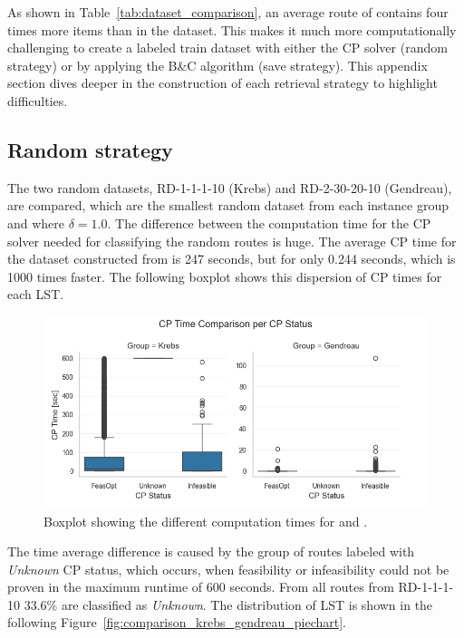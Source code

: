 As shown in Table~\ref{tab:dataset_comparison}, an average route of \krebsADataSetText contains four times more items than
in the \gendreauDataSetText dataset. This makes it much more computationally challenging to create a labeled train dataset with either
the \gls{CP} solver (random strategy) or by applying the B\&C algorithm (save strategy). This appendix section dives deeper in
the construction of each retrieval strategy to highlight difficulties.

\subsection{Random strategy}
\label{subsec:challenges_krebs_random}

The two random datasets, RD-1-1-1-10 (Krebs) and RD-2-30-20-10 (Gendreau), are compared, which are the smallest random dataset from each instance group and
where $\delta = 1.0$. The difference between the computation time for the \gls{CP} solver needed for classifying the random routes is huge. The average
\gls{CP} time for the dataset constructed from \krebsADataSetText is 247 seconds, but for \gendreauDataSetText only 0.244 seconds,
which is 1000 times faster. The following boxplot shows this dispersion of \gls{CP} times for each \gls{LST}.
\begin{figure}[ht]
	\centering
	\includegraphics[width=\textwidth]{pictures/comparison_krebs_gendreau/boxplot_cp_time.png}
	\caption{Boxplot showing the different computation times for \krebsADataSetText and \gendreauDataSet.}
	\label{fig:comparison_krebs_gendreau_boxplot}
\end{figure}

The time average difference is caused by the group of routes labeled with \textit{Unknown} \gls{CP} status, which occurs, when
feasibility or infeasibility could not be proven in the maximum runtime of 600 seconds. From all routes from RD-1-1-1-10
33.6\% are classified as \textit{Unknown}. The distribution of \gls{LST} is shown in the following Figure~\ref{fig:comparison_krebs_gendreau_piechart}.

